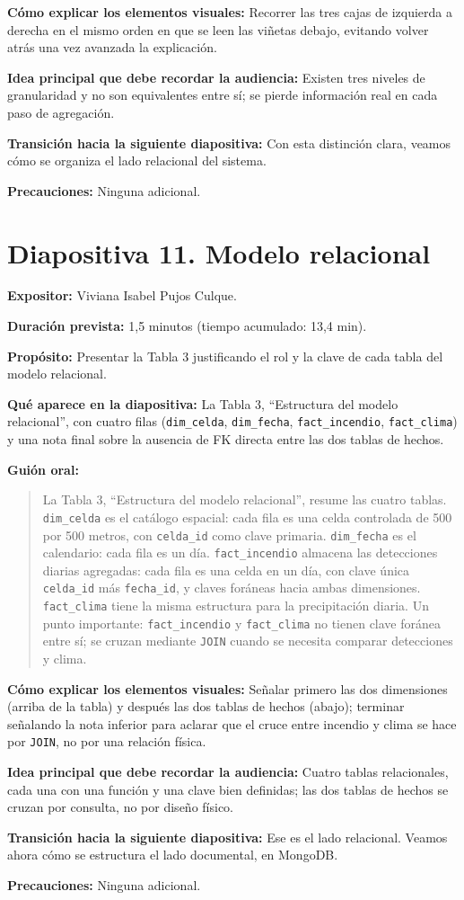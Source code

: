 \documentclass[11pt,a4paper]{article}
\newcommand{\campo}[2]{\par\medskip\noindent\textbf{#1:} #2\par}
\newenvironment{guionoral}{%
  \medskip\noindent\textbf{Gui\'on oral:}\par\smallskip
  \begin{quote}\small
}{%
  \end{quote}
}
\newcommand{\separadordiapositiva}{\bigskip\noindent{\color{Tierra!60}\hrulefill}\bigskip}
\begin{document}
\campo{C\'omo explicar los elementos visuales}{Recorrer las tres cajas
de izquierda a derecha en el mismo orden en que se leen las vi\~netas
debajo, evitando volver atr\'as una vez avanzada la explicaci\'on.}
\campo{Idea principal que debe recordar la audiencia}{Existen tres
niveles de granularidad y no son equivalentes entre s\'i; se pierde
informaci\'on real en cada paso de agregaci\'on.}
\campo{Transici\'on hacia la siguiente diapositiva}{Con esta
distinci\'on clara, veamos c\'omo se organiza el lado relacional del
sistema.}
\campo{Precauciones}{Ninguna adicional.}

\separadordiapositiva

\section*{Diapositiva 11. Modelo relacional}

\campo{Expositor}{Viviana Isabel Pujos Culque.}
\campo{Duraci\'on prevista}{1,5 minutos (tiempo acumulado: 13,4 min).}
\campo{Prop\'osito}{Presentar la Tabla 3 justificando el rol y la clave
de cada tabla del modelo relacional.}
\campo{Qu\'e aparece en la diapositiva}{La Tabla 3, ``Estructura del
modelo relacional'', con cuatro filas (\texttt{dim\_celda},
\texttt{dim\_fecha}, \texttt{fact\_incendio}, \texttt{fact\_clima}) y
una nota final sobre la ausencia de FK directa entre las dos tablas de
hechos.}

\begin{guionoral}
La Tabla 3, ``Estructura del modelo relacional'', resume las cuatro
tablas. \texttt{dim\_celda} es el cat\'alogo espacial: cada fila es una
celda controlada de 500 por 500 metros, con \texttt{celda\_id} como
clave primaria. \texttt{dim\_fecha} es el calendario: cada fila es un
d\'ia. \texttt{fact\_incendio} almacena las detecciones diarias
agregadas: cada fila es una celda en un d\'ia, con clave \'unica
\texttt{celda\_id} m\'as \texttt{fecha\_id}, y claves for\'aneas hacia
ambas dimensiones. \texttt{fact\_clima} tiene la misma estructura para
la precipitaci\'on diaria. Un punto importante: \texttt{fact\_incendio}
y \texttt{fact\_clima} no tienen clave for\'anea entre s\'i; se cruzan
mediante \texttt{JOIN} cuando se necesita comparar detecciones y clima.
\end{guionoral}

\campo{C\'omo explicar los elementos visuales}{Se\~nalar primero las
dos dimensiones (arriba de la tabla) y despu\'es las dos tablas de
hechos (abajo); terminar se\~nalando la nota inferior para aclarar que
el cruce entre incendio y clima se hace por \texttt{JOIN}, no por una
relaci\'on f\'isica.}
\campo{Idea principal que debe recordar la audiencia}{Cuatro tablas
relacionales, cada una con una funci\'on y una clave bien definidas;
las dos tablas de hechos se cruzan por consulta, no por dise\~no
f\'isico.}
\campo{Transici\'on hacia la siguiente diapositiva}{Ese es el lado
relacional. Veamos ahora c\'omo se estructura el lado documental, en
MongoDB.}
\campo{Precauciones}{Ninguna adicional.}
\end{document}
